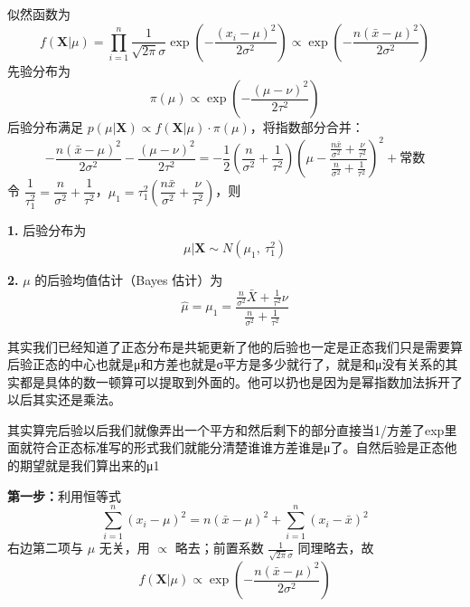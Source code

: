 \begin{solution}
似然函数为
\[
f(\boldsymbol{X}|\mu) = \prod_{i=1}^n \frac{1}{\sqrt{2\pi}\sigma}\exp\!\left(-\frac{(x_i-\mu)^2}{2\sigma^2}\right) \propto \exp\!\left(-\frac{n(\bar{x}-\mu)^2}{2\sigma^2}\right)
\]
先验分布为
\[
\pi(\mu) \propto \exp\!\left(-\frac{(\mu-\nu)^2}{2\tau^2}\right)
\]
后验分布满足 $p(\mu|\boldsymbol{X}) \propto f(\boldsymbol{X}|\mu)\cdot\pi(\mu)$，将指数部分合并：
\[
-\frac{n(\bar{x}-\mu)^2}{2\sigma^2} - \frac{(\mu-\nu)^2}{2\tau^2} = -\frac{1}{2}\left(\frac{n}{\sigma^2}+\frac{1}{\tau^2}\right)\left(\mu - \frac{\frac{n\bar{x}}{\sigma^2}+\frac{\nu}{\tau^2}}{\frac{n}{\sigma^2}+\frac{1}{\tau^2}}\right)^2 + \text{常数}
\]
令 $\dfrac{1}{\tau_1^2} = \dfrac{n}{\sigma^2}+\dfrac{1}{\tau^2}$，$\mu_1 = \tau_1^2\!\left(\dfrac{n\bar{x}}{\sigma^2}+\dfrac{\nu}{\tau^2}\right)$，则

\textbf{1.} 后验分布为
\[
\mu|\boldsymbol{X} \sim N(\mu_1,\ \tau_1^2)
\]

\textbf{2.} $\mu$ 的后验均值估计（Bayes 估计）为
\[
\hat{\mu} = \mu_1 = \frac{\frac{n}{\sigma^2}\bar{X} + \frac{1}{\tau^2}\nu}{\frac{n}{\sigma^2}+\frac{1}{\tau^2}}
\]
\end{solution}
\begin{dxtips}
 其实我们已经知道了正态分布是共轭更新了他的后验也一定是正态我们只是需要算后验正态的中心也就是μ和方差也就是σ平方是多少就行了，就是和μ没有关系的其实都是具体的数一顿算可以提取到外面的。他可以扔也是因为是幂指数加法拆开了以后其实还是乘法。
\end{dxtips}
\begin{dxtips}
    其实算完后验以后我们就像弄出一个平方和然后剩下的部分直接当1/方差了exp里面就符合正态标准写的形式我们就能分清楚谁谁方差谁是μ了。自然后验是正态他的期望就是我们算出来的μ1
\end{dxtips}
\begin{note}
\textbf{第一步：}利用恒等式
\[
\sum_{i=1}^n(x_i-\mu)^2 = n(\bar{x}-\mu)^2 + \sum_{i=1}^n(x_i-\bar{x})^2
\]
右边第二项与 $\mu$ 无关，用 $\propto$ 略去；前置系数 $\frac{1}{\sqrt{2\pi}\sigma}$ 同理略去，故
\[
f(\boldsymbol{X}|\mu) \propto \exp\!\left(-\frac{n(\bar{x}-\mu)^2}{2\sigma^2}\right)
\]


\end{note}
